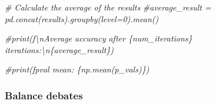 \documentclass[
]{article}
\newenvironment{Shaded}{\begin{snugshade}}{\end{snugshade}}
\newcommand{\CommentTok}[1]{\textcolor[rgb]{0.56,0.35,0.01}{\textit{#1}}}
\begin{document}
\begin{Shaded}
\begin{Highlighting}[]
\CommentTok{\# Calculate the average of the results}
\CommentTok{\#average\_result = pd.concat(results).groupby(level=0).mean()}

\CommentTok{\#print(f\textquotesingle{}\textbackslash{}nAverage accuracy after \{num\_iterations\} iterations:\textbackslash{}n\{average\_result\}\textquotesingle{})}

\CommentTok{\#print(f\textquotesingle{}pval mean: \{np.mean(p\_vals)\}\textquotesingle{})}
\end{Highlighting}
\end{Shaded}

\hypertarget{balance-debates}{%
\subsubsection{Balance debates}\label{balance-debates}}
\end{document}
